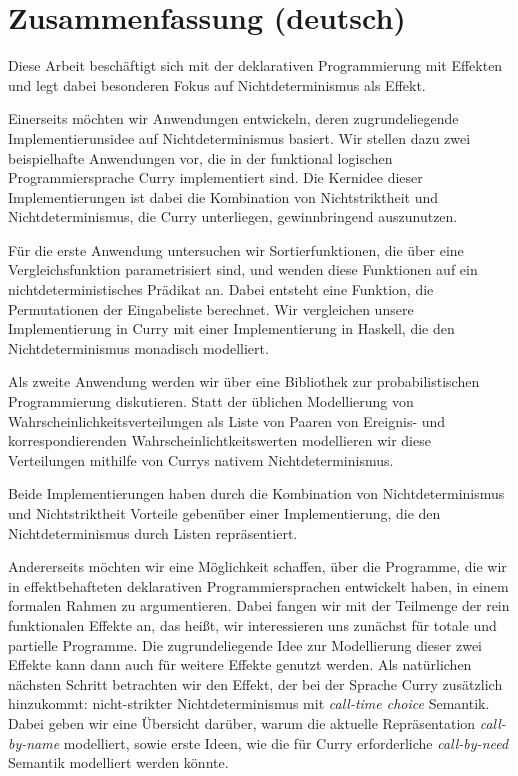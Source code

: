 \chapter*{Zusammenfassung (deutsch)}
\label{sec:abstract-diff}

Diese Arbeit besch\"aftigt sich mit der deklarativen Programmierung mit Effekten und legt dabei besonderen Fokus auf Nichtdeterminismus als Effekt.

Einerseits m\"ochten wir Anwendungen entwickeln, deren zugrundeliegende Implementierunsidee auf Nichtdeterminismus basiert.
Wir stellen dazu zwei beispielhafte Anwendungen vor, die in der funktional logischen Programmiersprache Curry implementiert sind.
Die Kernidee dieser Implementierungen ist dabei die Kombination von Nichtstriktheit und Nichtdeterminismus, die Curry unterliegen, gewinnbringend auszunutzen.

F\"ur die erste Anwendung untersuchen wir Sortierfunktionen, die \"uber eine Vergleichsfunktion parametrisiert sind, und wenden diese Funktionen auf ein nichtdeterministisches Pr\"adikat an.
Dabei entsteht eine Funktion, die Permutationen der Eingabeliste berechnet.
Wir vergleichen unsere Implementierung in Curry mit einer Implementierung in Haskell, die den Nichtdeterminismus monadisch modelliert.

Als zweite Anwendung werden wir \"uber eine Bibliothek zur probabilistischen Programmierung diskutieren.
Statt der \"ublichen Modellierung von Wahrscheinlichkeitsverteilungen als Liste von Paaren von Ereignis- und korrespondierenden Wahrscheinlichtkeitswerten modellieren wir diese Verteilungen mithilfe von Currys nativem Nichtdeterminismus.

Beide Implementierungen haben durch die Kombination von Nichtdeterminismus und Nichtstriktheit Vorteile geben\"uber einer Implementierung, die den Nichtdeterminismus durch Listen repr\"asentiert.

Andererseits m\"ochten wir eine M\"oglichkeit schaffen, \"uber die Programme, die wir in effektbehafteten deklarativen Programmiersprachen entwickelt haben, in einem formalen Rahmen zu argumentieren.
Dabei fangen wir mit der Teilmenge der rein funktionalen Effekte an, das hei\ss{}t, wir interessieren uns zun\"achst f\"ur totale und partielle Programme.
Die zugrundeliegende Idee zur Modellierung dieser zwei Effekte kann dann auch f\"ur weitere Effekte genutzt werden.
Als nat\"urlichen n\"achsten Schritt betrachten wir den Effekt, der bei der Sprache Curry zus\"atzlich hinzukommt: nicht\--strikter Nichtdeterminismus mit \emph{call\--time choice} Semantik.
Dabei geben wir eine \"Ubersicht dar\"uber, warum die aktuelle Repr\"asentation \emph{call\--by\--name} modelliert, sowie erste Ideen, wie die f\"ur Curry erforderliche \emph{call\--by\--need} Semantik modelliert werden k\"onnte.

\endgroup